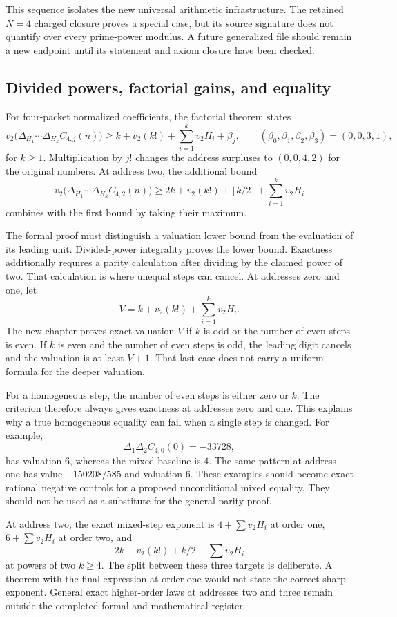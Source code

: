 This sequence isolates the new universal arithmetic infrastructure. The retained $N=4$ charged closure proves a special case, but its source signature does not quantify over every prime-power modulus. A future generalized file should remain a new endpoint until its statement and axiom closure have been checked.

\subsection{Divided powers, factorial gains, and equality}
For four-packet normalized coefficients, the factorial theorem states
\[
 v_2\bigl(\Delta_{H_1}\cdots\Delta_{H_k}C_{4,j}(n)\bigr)
 \ge k+v_2(k!)+\sum_{i=1}^k v_2H_i+\beta_j,
 \qquad (\beta_0,\beta_1,\beta_2,\beta_3)=(0,0,3,1),
\]
for $k\ge1$. Multiplication by $j!$ changes the address surpluses to $(0,0,4,2)$ for the original numbers. At address two, the additional bound
\[
 v_2\bigl(\Delta_{H_1}\cdots\Delta_{H_k}C_{4,2}(n)\bigr)
 \ge2k+v_2(k!)+\lfloor k/2\rfloor+\sum_{i=1}^k v_2H_i
\]
combines with the first bound by taking their maximum.

The formal proof must distinguish a valuation lower bound from the evaluation of its leading unit. Divided-power integrality proves the lower bound. Exactness additionally requires a parity calculation after dividing by the claimed power of two. That calculation is where unequal steps can cancel. At addresses zero and one, let
\[
 V=k+v_2(k!)+\sum_{i=1}^k v_2H_i.
\]
The new chapter proves exact valuation $V$ if $k$ is odd or the number of even steps is even. If $k$ is even and the number of even steps is odd, the leading digit cancels and the valuation is at least $V+1$. That last case does not carry a uniform formula for the deeper valuation.

For a homogeneous step, the number of even steps is either zero or $k$. The criterion therefore always gives exactness at addresses zero and one. This explains why a true homogeneous equality can fail when a single step is changed. For example,
\[
 \Delta_1\Delta_2 C_{4,0}(0)=-33728,
\]
has valuation $6$, whereas the mixed baseline is $4$. The same pattern at address one has value $-150208/585$ and valuation $6$. These examples should become exact rational negative controls for a proposed unconditional mixed equality. They should not be used as a substitute for the general parity proof.

At address two, the exact mixed-step exponent is $4+\sum v_2H_i$ at order one, $6+\sum v_2H_i$ at order two, and
\[
 2k+v_2(k!)+k/2+\sum v_2H_i
\]
at powers of two $k\ge4$. The split between these three targets is deliberate. A theorem with the final expression at order one would not state the correct sharp exponent. General exact higher-order laws at addresses two and three remain outside the completed formal and mathematical register.

